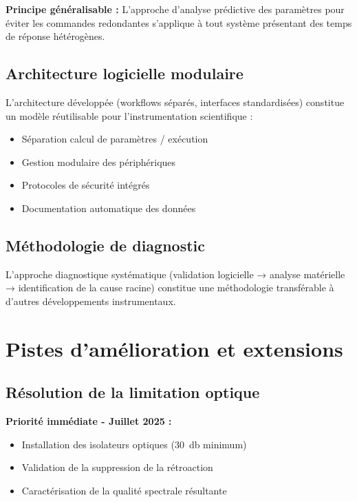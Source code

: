 \textbf{Principe généralisable :} L'approche d'analyse prédictive des paramètres pour éviter les commandes redondantes s'applique à tout système présentant des temps de réponse hétérogènes.

\subsection{Architecture logicielle modulaire}

L'architecture développée (workflows séparés, interfaces standardisées) constitue un modèle réutilisable pour l'instrumentation scientifique :
\begin{itemize}
    \item Séparation calcul de paramètres / exécution
    \item Gestion modulaire des périphériques
    \item Protocoles de sécurité intégrés
    \item Documentation automatique des données
\end{itemize}

\subsection{Méthodologie de diagnostic}

L'approche diagnostique systématique (validation logicielle → analyse matérielle → identification de la cause racine) constitue une méthodologie transférable à d'autres développements instrumentaux.

\section{Pistes d'amélioration et extensions}

\subsection{Résolution de la limitation optique}

\textbf{Priorité immédiate - Juillet 2025 :}
\begin{itemize}
    \item Installation des isolateurs optiques (\SI{30}{\decibel} minimum)
    \item Validation de la suppression de la rétroaction
    \item Caractérisation de la qualité spectrale résultante
\end{itemize}

